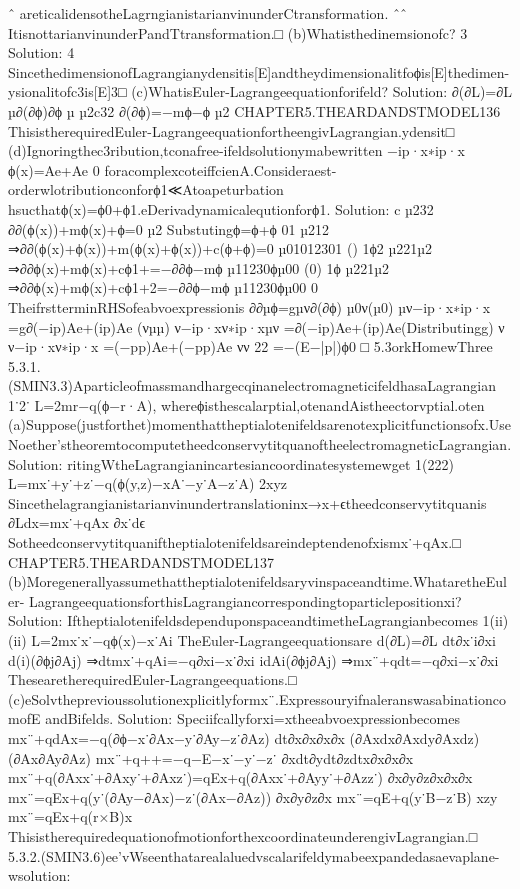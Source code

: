 {{{{{{{{{{ˆ
areticalidensotheLagrngianistarianvinunderCtransformation.
ˆˆ
ItisnottarianvinunderPandTtransformation.□
(b)Whatisthedinemsionofc?
3
Solution:
4
SincethedimensionofLagrangianydensitis[E]andtheydimensionalitfoϕis[E]thedimen-
ysionalitofc3is[E]3□
(c)WhatisEuler-Lagrangeequationforifeld?
Solution:
∂(∂L)=∂L
µ∂(∂ϕ)∂ϕ
µ
µ2c32
∂(∂ϕ)=−mϕ−ϕ
µ2
CHAPTER5.THEARDANDSTMODEL136
ThisistherequiredEuler-LagrangeequationfortheengivLagrangian.ydensit□
(d)Ignoringthec3ribution,tconafree-ifeldsolutionymabewritten
−ip·x∗ip·x
ϕ(x)=Ae+Ae
0
foracomplexcoteiffcienA.Consideraest-orderwlotributionconforϕ1≪Atoapeturbation
hsucthatϕ(x)=ϕ0+ϕ1.eDerivadynamicalequtionforϕ1.
Solution:
c
µ232
∂∂(ϕ(x))+mϕ(x)+ϕ=0
µ2
Substutingϕ=ϕ+ϕ
01
µ212
⇒∂∂(ϕ(x)+ϕ(x))+m(ϕ(x)+ϕ(x))+c(ϕ+ϕ)=0
µ01012301
()
1ϕ2
µ221µ2
⇒∂∂ϕ(x)+mϕ(x)+cϕ1+=−∂∂ϕ−mϕ
µ11230ϕµ00
(0)
1ϕ
µ221µ2
⇒∂∂ϕ(x)+mϕ(x)+cϕ1+2=−∂∂ϕ−mϕ
µ11230ϕµ00
0
TheifrstterminRHSofeabvoexpressionis
∂∂µϕ=gµν∂(∂ϕ)
µ0ν(µ0)
µν−ip·x∗ip·x
=g∂(−ip)Ae+(ip)Ae
(νµµ)
ν−ip·xν∗ip·xµν
=∂(−ip)Ae+(ip)Ae(Distributingg)
ν
ν−ip·xν∗ip·x
=(−pp)Ae+(−pp)Ae
νν
22
=−(E−|p|)ϕ0
□
5.3orkHomewThree
5.3.1.(SMIN3.3)AparticleofmassmandhargecqinanelectromagneticifeldhasaLagrangian
1˙2˙
L=2mr−q(ϕ−r·A),
whereϕisthescalarptial,otenandAistheectorvptial.oten
(a)Suppose(justforthet)momenthattheptialotenifeldsarenotexplicitfunctionsofx.Use
Noether’stheoremtocomputetheedconservytitquanoftheelectromagneticLagrangian.
Solution:
ritingWtheLagrangianincartesiancoordinatesystemewget
1(222)
L=mx˙+y˙+z˙−q(ϕ(y,z)−xA˙−y˙A−z˙A)
2xyz
Sincethelagrangianistarianvinundertranslationinx→x+ϵtheedconservytitquanis
∂Ldx=mx˙+qAx
∂x˙dϵ
Sotheedconservytitquaniftheptialotenifeldsareindeptendenofxismx˙+qAx.□
CHAPTER5.THEARDANDSTMODEL137
(b)Moregenerallyassumethattheptialotenifeldsaryvinspaceandtime.WhataretheEuler-
LagrangeequationsforthisLagrangiancorrespondingtoparticlepositionxi?
Solution:
IftheptialotenifeldsdependuponspaceandtimetheLagrangianbecomes
1(ii)(ii)
L=2mx˙x˙−qϕ(x)−x˙Ai
TheEuler-Lagrangeequationsare
d(∂L)=∂L
dt∂x˙i∂xi
d(i)(∂ϕj∂Aj)
⇒dtmx˙+qAi=−q∂xi−x˙∂xi
idAi(∂ϕj∂Aj)
⇒mx¨+qdt=−q∂xi−x˙∂xi
ThesearetherequiredEuler-Lagrangeequations.□
(c)eSolvtheprevioussolutionexplicitlyformx¨.ExpressouryifnaleranswasabinationcomofE
andBifelds.
Solution:
Speciifcallyforxi=xtheeabvoexpressionbecomes
mx¨+qdAx=−q(∂ϕ−x˙∂Ax−y˙∂Ay−z˙∂Az)
dt∂x∂x∂x∂x
(∂Axdx∂Axdy∂Axdz)(∂Ax∂Ay∂Az)
mx¨+q++=−q−E−x˙−y˙−z˙
∂xdt∂ydt∂zdtx∂x∂x∂x
mx¨+q(∂Axx˙+∂Axy˙+∂Axz˙)=qEx+q(∂Axx˙+∂Ayy˙+∂Azz˙)
∂x∂y∂z∂x∂x∂x
mx¨=qEx+q(y˙(∂Ay−∂Ax)−z˙(∂Ax−∂Az))
∂x∂y∂z∂x
mx¨=qE+q(y˙B−z˙B)
xzy
mx¨=qEx+q(r×B)x
ThisistherequiredequationofmotionforthexcoordinateunderengivLagrangian.□
5.3.2.(SMIN3.6)ee’vWseenthatarealaluedvscalarifeldymabeexpandedasaevaplane-wsolution:
}}}}}}}}}}
